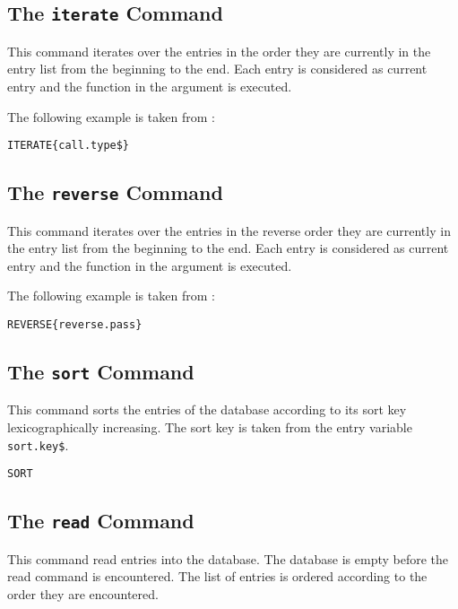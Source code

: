 \subsection{The \texttt{iterate} Command}

This command iterates over the entries in the order they are currently
in the entry list from the beginning to the end. Each entry is
considered as current entry and the function in the argument is
executed.

The following example is taken from :

\begin{lstlisting}[language=bst]
  ITERATE{call.type$}
\end{lstlisting}


\subsection{The \texttt{reverse} Command}

This command iterates over the entries in the reverse order they are
currently in the entry list from the beginning to the end. Each entry
is considered as current entry and the function in the argument is
executed.

The following example is taken from :

\begin{lstlisting}[language=bst]
  REVERSE{reverse.pass}
\end{lstlisting}


\subsection{The \texttt{sort} Command}
%
\label{sec:sort}

This command sorts the entries of the database according to its sort
key lexicographically increasing. The sort key is taken from the entry
variable \texttt{sort.key\$}.

\begin{lstlisting}[language=bst]
  SORT
\end{lstlisting}


\subsection{The \texttt{read} Command}

This command read entries into the database. The database is empty
before the read command is encountered. The list of entries is ordered
according to the order they are encountered.


